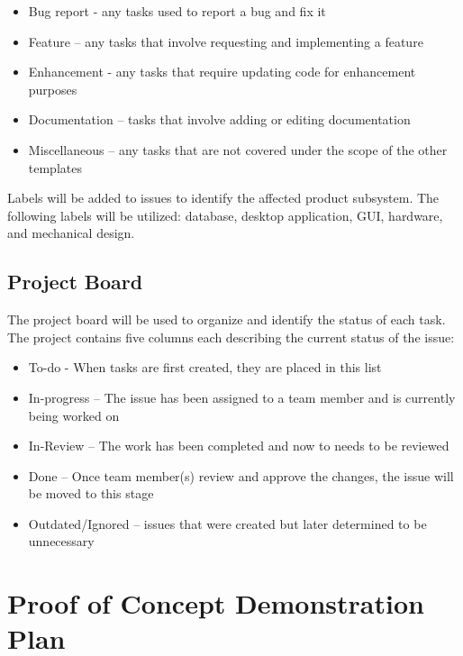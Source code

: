 \documentclass[12pt,titlepage]{article}
\begin{document}
\begin{itemize}
	\item Bug report - any tasks used to report a bug and fix it
	\item Feature – any tasks that involve requesting and implementing a feature
	\item Enhancement - any tasks that require updating code for enhancement purposes
	\item Documentation – tasks that involve adding or editing documentation
	\item Miscellaneous – any tasks that are not covered under the scope of the other templates
\end{itemize}

\noindent
Labels will be added to issues to identify the affected product subsystem. The following labels will be utilized: 
database, desktop application, GUI, hardware, and mechanical design.

\subsection{Project Board}
The project board will be used to organize and identify the status of each task. 
The project contains five columns each describing the current status of the issue:

\begin{itemize}
	\item To-do - When tasks are first created, they are placed in this list
	\item In-progress – The issue has been assigned to a team member and is currently being worked on
	\item In-Review – The work has been completed and now to needs to be reviewed
	\item Done – Once team member(s) review and approve the changes, the issue will be moved to this stage
	\item Outdated/Ignored – issues that were created but later determined to be unnecessary 
\end{itemize}

\newpage

\section{Proof of Concept Demonstration Plan}
\end{document}
